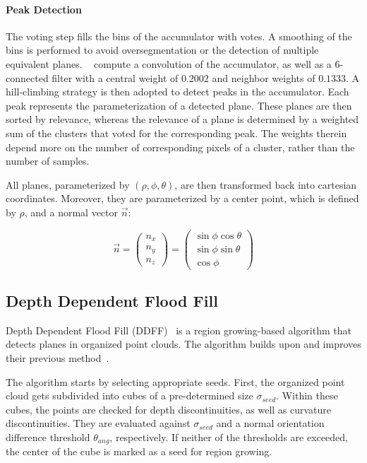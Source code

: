 \documentclass[main.tex]{subfiles}
\begin{document}
\paragraph{Peak Detection}
The voting step fills the bins of the accumulator with votes. A smoothing of the bins is performed to avoid
oversegmentation or the detection of multiple equivalent planes.
\citeauthor{Vera_Lucio_Fernandes_Velho_2018}~\cite[Section~3.5]{Vera_Lucio_Fernandes_Velho_2018} compute a convolution of the
accumulator, as well as a 6-connected filter with a central weight of $0.2002$ and neighbor weights of $0.1333$.
A hill-climbing strategy is then adopted to detect peaks in the accumulator. Each peak represents the
parameterization of a detected plane. These planes are then sorted by relevance, whereas the relevance of a plane
is determined by a weighted sum of the clusters that voted for the corresponding peak. The weights therein
depend more on the number of corresponding pixels of a cluster, rather than the number of samples.

All planes, parameterized by $(\rho,\phi,\theta)$, are then transformed back into cartesian coordinates.
Moreover, they are parameterized by a center point, which is defined by $\rho$, and a normal vector $\overrightarrow{n}$:
\def\C{
    \begin{pmatrix}
        n_x \\
        n_y \\
        n_z
    \end{pmatrix}
}
\def\D{
    \begin{pmatrix}
        \sin\phi\cos\theta \\
        \sin\phi\sin\theta \\
        \cos\phi
    \end{pmatrix}
}

\begin{equation}
    \overrightarrow{n}  = \C = \D
\end{equation}


\subsection{Depth Dependent Flood Fill}
\label{subsec:bg-ddff}
Depth Dependent Flood Fill (DDFF)~\cite{Roychoudhury_Missura_Bennewitz_2021_new} is a region growing-based algorithm that detects planes in organized point clouds.
The algorithm builds upon and improves their previous method~\cite{Roychoudhury_Missura_Bennewitz_2021_old}.

The algorithm starts by selecting appropriate seeds. First, the organized point cloud gets subdivided into cubes of a
pre-determined size $\sigma_{seed}$. Within these cubes, the points are checked for depth discontinuities, as well as
curvature discontinuities. They are evaluated against $\sigma_{seed}$ and a normal orientation difference
threshold $\theta_{ang}$, respectively. If neither of the thresholds are exceeded, the center of the cube is marked as
a seed for region growing.
\end{document}
